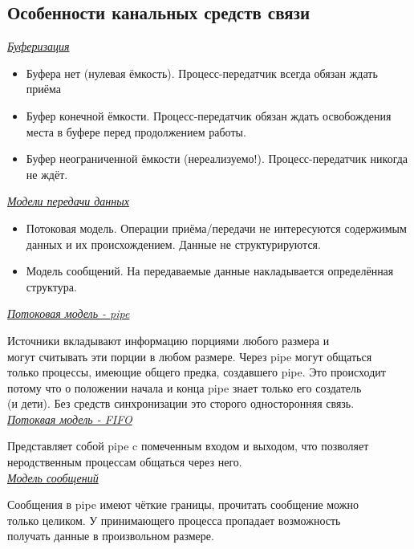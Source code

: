 \documentclass[12pt, a4paper]{article}
\begin{document}
    \subsection*{Особенности канальных средств связи}
    \underline{\textit{Буферизация}}
    \begin{itemize}
        \item Буфера нет (нулевая ёмкость). Процесс-передатчик всегда обязан ждать приёма
        \item Буфер конечной ёмкости. Процесс-передатчик обязан ждать освобождения места в буфере перед продолжением работы.
        \item Буфер неограниченной ёмкости (нереализуемо!). Процесс-передатчик никогда не ждёт.
    \end{itemize}
    \underline{\textit{Модели передачи данных}}
    \begin{itemize}
        \item Потоковая модель. Операции приёма/передачи не интересуются содержимым данных и их происхождением. Данные не структурируются.
        \item Модель сообщений. На передаваемые данные накладывается определённая структура.
    \end{itemize}
    \underline{\textit{Потоковая модель - pipe}}\par
    Источники вкладывают информацию порциями любого размера и\\
    могут считывать эти порции в любом размере. Через pipe могут общаться\\
    только процессы, имеющие общего предка, создавшего pipe. Это происходит\\
    потому что о положении начала и конца pipe знает только его создатель\\
    (и дети). Без средств синхронизации это сторого односторонняя связь.\\
    \underline{\textit{Потоквая модель - FIFO}}\par
    Представляет собой pipe c помеченным входом и выходом, что позволяет\\
    неродственным процессам общаться через него.\\
    \underline{\textit{Модель сообщений}}\par
    Сообщения в pipe имеют чёткие границы, прочитать сообщение можно\\
    только целиком. У принимающего процесса пропадает возможность\\ 
    получать данные в произвольном размере.
\end{document}
